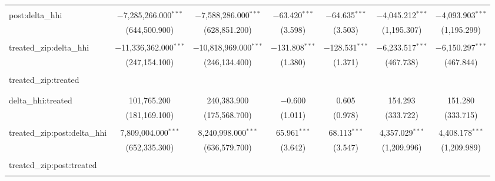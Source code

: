 \begin{table}[H]
{\begin{tabular}{@{\extracolsep{5pt}}lcccccc}
   & & & & & & \\  

  post:delta\_hhi & $-$7,285,266.000$^{***}$ & $-$7,588,286.000$^{***}$ & $-$63.420$^{***}$ & $-$64.635$^{***}$ & $-$4,045.212$^{***}$ & $-$4,093.903$^{***}$ \\  

   & (644,500.900) & (628,851.200) & (3.598) & (3.503) & (1,195.307) & (1,195.299) \\  

   & & & & & & \\  

  treated\_zip:delta\_hhi & $-$11,336,362.000$^{***}$ & $-$10,818,969.000$^{***}$ & $-$131.808$^{***}$ & $-$128.531$^{***}$ & $-$6,233.517$^{***}$ & $-$6,150.297$^{***}$ \\  

   & (247,154.100) & (246,134.400) & (1.380) & (1.371) & (467.738) & (467.844) \\  

   & & & & & & \\  

  treated\_zip:treated &  &  &  &  &  &  \\  

   &  &  &  &  &  &  \\  

   & & & & & & \\  

  delta\_hhi:treated & 101,765.200 & 240,383.900 & $-$0.600 & 0.605 & 154.293 & 151.280 \\  

   & (181,169.100) & (175,568.700) & (1.011) & (0.978) & (333.722) & (333.715) \\  

   & & & & & & \\  

  treated\_zip:post:delta\_hhi & 7,809,004.000$^{***}$ & 8,240,998.000$^{***}$ & 65.961$^{***}$ & 68.113$^{***}$ & 4,357.029$^{***}$ & 4,408.178$^{***}$ \\  

   & (652,335.300) & (636,579.700) & (3.642) & (3.547) & (1,209.996) & (1,209.989) \\  

   & & & & & & \\  

  treated\_zip:post:treated &  &  &  &  &  &  \\  

   &  &  &  &  &  &  \\  


\end{tabular}}
\end{table}
